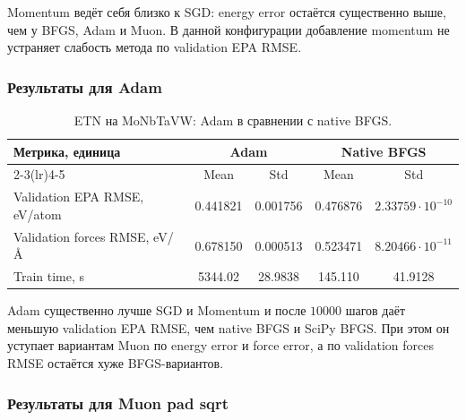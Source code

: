 
Momentum ведёт себя близко к SGD: energy error остаётся существенно выше, чем у BFGS, Adam и Muon. В данной конфигурации добавление momentum не устраняет слабость метода по validation EPA RMSE.

\FloatBarrier

\subsubsection{Результаты для Adam}

\begin{table}[H]
\centering
\small
\caption{ETN на MoNbTaVW: Adam в сравнении с native BFGS.}
\label{tab:etn-monbtavw-adam}
\begin{tabular}{lcccc}
\toprule
\multirow{2}{*}{Метрика, единица} & \multicolumn{2}{c}{Adam} & \multicolumn{2}{c}{Native BFGS} \\
\cmidrule(lr){2-3}\cmidrule(lr){4-5}
 & Mean & Std & Mean & Std \\
\midrule
Validation EPA RMSE, eV/atom & 0.441821 & 0.001756 & 0.476876 & \(2.33759\cdot 10^{-10}\) \\
Validation forces RMSE, eV/\AA & 0.678150 & 0.000513 & 0.523471 & \(8.20466\cdot 10^{-11}\) \\
Train time, s & 5344.02 & 28.9838 & 145.110 & 41.9128 \\
\bottomrule
\end{tabular}
\end{table}


Adam существенно лучше SGD и Momentum и после \(10000\) шагов даёт меньшую validation EPA RMSE, чем native BFGS и SciPy BFGS. При этом он уступает вариантам Muon по energy error и force error, а по validation forces RMSE остаётся хуже BFGS-вариантов.

\FloatBarrier

\subsubsection{Результаты для Muon pad sqrt}

